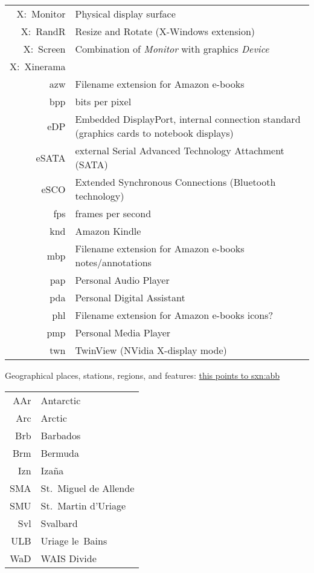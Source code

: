 \documentclass[12pt,twoside]{article}
\begin{document}
\begin{longtable}[>{\bfseries}l]{>{\ttfamily}r l}
X:~Monitor & Physical display surface \\
X:~RandR & Resize and Rotate (X-Windows extension) \\
X:~Screen & Combination of \textit{Monitor} with graphics \textit{Device} \\
X:~Xinerama & \\
azw & Filename extension for Amazon e-books \\
bpp & bits per pixel \\
eDP & Embedded DisplayPort, internal connection standard (graphics cards to notebook displays) \\
eSATA & external Serial Advanced Technology Attachment (SATA) \\
eSCO & Extended Synchronous Connections (Bluetooth technology) \\
fps & frames per second \\
knd & Amazon Kindle \\
mbp & Filename extension for Amazon e-books notes/annotations \\
pap & Personal Audio Player \\
pda & Personal Digital Assistant \\
phl & Filename extension for Amazon e-books icons? \\
pmp & Personal Media Player \\
twn & TwinView (NVidia X-display mode) \\
\end{longtable}

Geographical places, stations, regions, and features:
\hyperlink{sxn:abb}{this points to sxn:abb}
\begin{longtable}[>{\bfseries}l]{>{\ttfamily}r l}
AAr & Antarctic \\
Arc & Arctic \\
Brb & Barbados \\
Brm & Bermuda \\
Izn & Iza\~{n}a \\
SMA & St.~Miguel de Allende \\
SMU & St.~Martin d'Uriage \\
Svl & Svalbard \\
ULB & Uriage le~Bains \\
WaD & WAIS Divide \\
\end{longtable}
\end{document}
